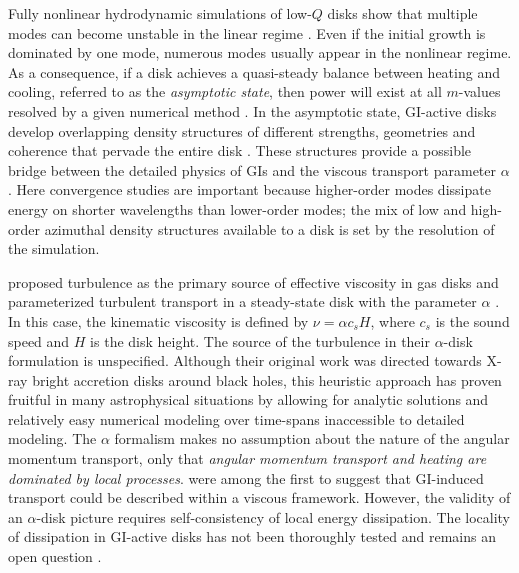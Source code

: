 \documentclass[manuscript]{aastex}
\begin{document}
Fully nonlinear hydrodynamic simulations of low-$Q$ disks show that multiple
modes can become unstable in the linear regime \citep{nelson1998, pickett1998, lodato2004,boley2006,cossins2009}.  Even if the initial growth is dominated by one mode, numerous modes usually appear in the nonlinear regime. As a consequence, if a disk achieves a quasi-steady balance between heating and cooling, referred to as the {\it asymptotic state},
then power will exist at all $m$-values resolved by a given numerical method \citep{mejia2005,boley2006}.  
In the asymptotic state, GI-active disks develop overlapping density structures of different strengths, geometries and coherence that pervade the entire disk \citep[e.g.,][]{pickett2003, mejia2005,boley2006}.
These structures provide a possible bridge between the detailed physics of GIs and the viscous transport parameter $\alpha$
\citep{gammie2001}.  Here convergence studies are important because 
higher-order modes dissipate energy on shorter wavelengths than lower-order modes; the mix of low and high-order azimuthal density structures
available to a disk is set by the resolution of the simulation.

\citet{shakura1973} proposed turbulence as the primary source of effective viscosity in gas disks
and parameterized turbulent transport in a steady-state disk with the  parameter $\alpha$ \citep[see also][]{pringle1981}.  In this case,  the kinematic
viscosity is defined by $\nu = \alpha c_s H$, where  $c_s$ is the sound speed and $H$ is the disk height.
The source of the 
turbulence in their $\alpha$-disk formulation is unspecified. Although their original work was directed towards X-ray bright
accretion disks around black holes, this heuristic approach has proven fruitful in many astrophysical situations by allowing for analytic solutions and relatively easy numerical modeling over time-spans inaccessible to detailed modeling. 
The $\alpha$ formalism makes no assumption about the nature of the angular momentum transport, only that {\it angular momentum transport
and heating are dominated by local processes}. \citet{lin1987,lin1990} were among the first to suggest
that GI-induced transport could be described within a viscous
framework.  However, the  validity of an $\alpha$-disk picture requires self-consistency of local energy dissipation. 
The locality of dissipation in GI-active disks has not been thoroughly tested and remains an open question \citep{lodato2004,lodato2005,boley2006}. 
\end{document}
